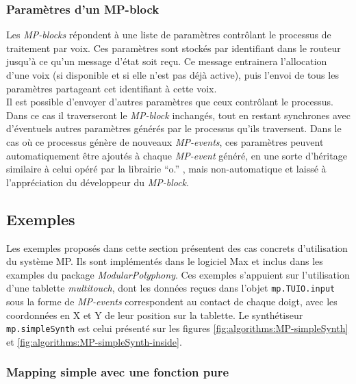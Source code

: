 \subsubsection{Paramètres d'un MP-block}

\noindent Les \textit{MP-blocks} répondent à une liste de paramètres contrôlant le processus de traitement par voix. Ces paramètres sont stockés par identifiant dans le routeur jusqu'à ce qu'un message d'état soit reçu. Ce message entrainera l'allocation d'une voix (si disponible et si elle n'est pas déjà active), puis l'envoi de tous les paramètres partageant cet identifiant à cette voix.\\
\indent Il est possible d'envoyer d'autres paramètres que ceux contrôlant le processus. Dans ce cas il traverseront le \textit{MP-block} inchangés, tout en restant synchrones avec d'éventuels autres paramètres générés par le processus qu'ils traversent. Dans le cas où ce processus génère de nouveaux \textit{MP-events}, ces paramètres peuvent automatiquement être ajoutés à chaque \textit{MP-event} généré, en une sorte d'héritage similaire à celui opéré par la librairie ``o.'' \cite{freed_composability_2011}, mais non-automatique et laissé à l'appréciation du développeur du \textit{MP-block}.

\subsection{Exemples}

\noindent Les exemples proposés dans cette section présentent des cas concrets d'utilisation du système MP. Ils sont implémentés dans le logiciel Max et inclus dans les examples du package \textit{ModularPolyphony}. Ces exemples s'appuient sur l'utilisation d'une tablette \textit{multitouch}, dont les données reçues dans l'objet \verb|mp.TUIO.input| sous la forme de \textit{MP-events} correspondent au contact de chaque doigt, avec les coordonnées en X et Y de leur position sur la tablette. Le synthétiseur \verb|mp.simpleSynth| est celui présenté sur les figures \ref{fig:algorithms:MP-simpleSynth} et \ref{fig:algorithms:MP-simpleSynth-inside}.

\subsubsection{Mapping simple avec une fonction pure}

